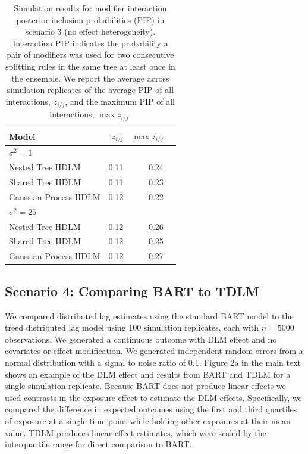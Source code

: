 \documentclass[12pt]{article}
\begin{document}
\begin{table}[!ht]
\footnotesize
    \centering
    \caption{Simulation results for modifier interaction posterior inclusion probabilities (PIP) in scenario 3 (no effect heterogeneity). Interaction PIP indicates the probability a pair of modifiers was used for two consecutive splitting rules in the same tree at least once in the ensemble. We report the average across simulation replicates of the average PIP of all interactions, $z_{i/j}$, and the maximum PIP of all interactions, $\max z_{i/j}$.}\vspace{6pt}
    \label{tab:scen3_inc}
    \begin{tabular}{lrrr}
        \toprule[2pt]
        Model & $z_{i/j}$ & $\max z_{i/j}$\\
        \midrule
        \multicolumn{3}{l}{$\sigma^2=1$}\\
Nested Tree HDLM & 0.11 & 0.24\\
Shared Tree HDLM & 0.11 & 0.23\\
Gaussian Process HDLM & 0.12 & 0.22\\

        \midrule
        \multicolumn{3}{l}{$\sigma^2=25$}\\
Nested Tree HDLM & 0.12 & 0.26\\
Shared Tree HDLM & 0.12 & 0.25\\
Gaussian Process HDLM & 0.12 & 0.27\\
        \bottomrule[2pt]
    \end{tabular}
\end{table}



\subsection{Scenario 4: Comparing BART to TDLM}
We compared distributed lag estimates using the standard BART model to the treed distributed lag model using 100 simulation replicates, each with $n=5000$ observations. We generated a continuous outcome with DLM effect and no covariates or effect modification. We generated independent random errors from a normal distribution with a signal to noise ratio of 0.1. Figure 2a in the main text shows an example of the DLM effect and results from BART and TDLM for a single simulation replicate. Because BART does not produce linear effects we used contrasts in the exposure effect to estimate the DLM effects. Specifically, we compared the difference in expected outcomes using the first and third quartiles of exposure at a single time point while holding other exposures at their mean value. TDLM produces linear effect estimates, which were scaled by the interquartile range for direct comparison to BART.
\end{document}
